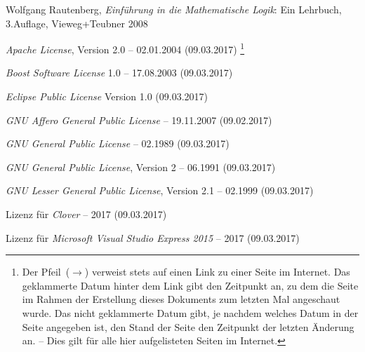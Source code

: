 \begin{flushleft}
	\begin{thebibliography}{12}
		\likechapter[section]{\bibname}  %
		\label{dic:Literaturverzeichnis} %
		
		Wolfgang Rautenberg,
		\emph{Einführung in die Mathematische Logik}:
		Ein Lehrbuch, 3.\@ Auflage, Vieweg+Teubner 2008
		
		\emph{Apache License}, Version 2.0
		-- 02.01.2004
		 (09.03.2017)%
		\footnote{%
			Der Pfeil~($\rightarrow$)
			verweist stets auf einen Link zu einer Seite im Internet.
			Das geklammerte Datum hinter dem Link gibt den Zeitpunkt an,
			zu dem die Seite im Rahmen der Erstellung dieses Dokuments
			zum letzten Mal angeschaut wurde.
			Das nicht geklammerte Datum gibt,
			je nachdem welches Datum in der Seite angegeben ist,
			den Stand der Seite
			\textbzw den Zeitpunkt der letzten Änderung an.
			-- Dies gilt für alle hier aufgelisteten Seiten im Internet.%
		}
		
		\emph{Boost Software License} 1.0 -- 17.08.2003
		(09.03.2017)
		
		\emph{Eclipse Public License} Version 1.0
		(09.03.2017)
		
		\emph{GNU Affero General Public License}
		-- 19.11.2007
		(09.02.2017)
		
		\emph{GNU General Public License}
		-- 02.1989 (09.03.2017)
		
		\emph{GNU General Public License}, Version 2
		-- 06.1991
		(09.03.2017)
		
		\emph{GNU Lesser General Public License},
		Version 2.1 -- 02.1999
		(09.03.2017)
		
		Lizenz für \emph{Clover}
		-- 2017
		(09.03.2017)
		
		Lizenz
		für \emph{Microsoft Visual Studio Express 2015}
		-- 2017
		(09.03.2017)
		

\end{thebibliography}
\end{flushleft}
